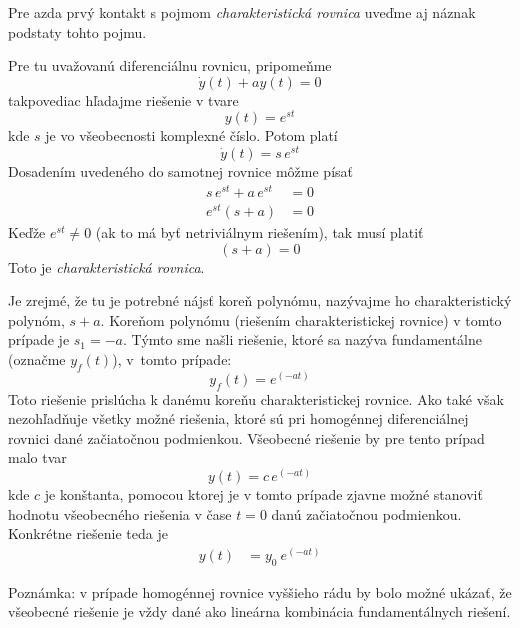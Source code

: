\documentclass[a4paper, 10pt, ]{article}
\begin{document}
Pre azda prvý kontakt s pojmom \emph{charakteristická rovnica} uveďme aj náznak podstaty tohto pojmu.

Pre tu uvažovanú diferenciálnu rovnicu, pripomeňme
\begin{equation}
    \dot y(t) + a y(t) = 0
\end{equation}
takpovediac hľadajme riešenie v tvare
\begin{equation}
    y(t) = e^{st}
\end{equation}
kde $s$ je vo všeobecnosti komplexné číslo. Potom platí
\begin{equation}
    \dot y(t) = s\,e^{st}
\end{equation}
Dosadením uvedeného do samotnej rovnice môžme písať
\begin{align}
    s\,e^{st} + a\, e^{st} &= 0 \\
    e^{st} \left(s + a\right) &= 0 
\end{align}
Keďže $e^{st} \neq 0$ (ak to má byť netriviálnym riešením), tak musí platiť
\begin{equation}
    \left(s + a\right) = 0
\end{equation}
Toto je \emph{charakteristická rovnica}.

Je zrejmé, že tu je potrebné nájsť koreň polynómu, nazývajme ho charakteristický polynóm, $s + a$. Koreňom polynómu (riešením charakteristickej rovnice) v tomto prípade je $s_1 = -a$. Týmto sme našli riešenie, ktoré sa nazýva fundamentálne (označme $y_f(t)$), v~tomto prípade:
\begin{equation}
    y_f(t) = e^{\left( - a t \right)} 
\end{equation}
Toto riešenie prislúcha k danému koreňu charakteristickej rovnice. Ako také však nezohľadňuje všetky možné riešenia, ktoré sú pri homogénnej diferenciálnej rovnici dané začiatočnou podmienkou. Všeobecné riešenie by pre tento prípad malo tvar
\begin{equation}
    y(t) = c\,e^{\left( - a t \right)} 
\end{equation}
kde $c$ je konštanta, pomocou ktorej je v tomto prípade zjavne možné stanoviť hodnotu všeobecného riešenia v čase $t=0$ danú začiatočnou podmienkou. Konkrétne riešenie teda je
\begin{align}
    y(t)   &=  y_0 \ e^{\left( - a t \right)}  
\end{align}

Poznámka: v prípade homogénnej rovnice vyššieho rádu by bolo možné ukázať, že všeobecné riešenie je vždy dané ako lineárna kombinácia fundamentálnych riešení.
\end{document}
